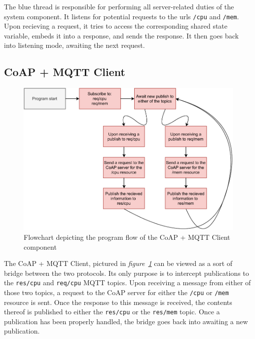 The blue thread is responsible for performing all server-related duties of the system component. It listens for potential requests to the urls \lstinline{/cpu} and \lstinline{/mem}. Upon recieving a request, it tries to access the corresponding shared state variable, embeds it into a response, and sends the response. It then goes back into listening mode, awaiting the next request.

\subsection{CoAP + MQTT Client}

\begin{figure}[H]
	\begin{center}
		\includegraphics[width=\textwidth]{./doc/coap_mqtt_flowchart.pdf}
		\caption{Flowchart depicting the program flow of the CoAP + MQTT Client component} 
		\label{coap-mqtt}
	\end{center}
\end{figure}

The CoAP + MQTT Client, pictured in \textit{figure~\ref{coap-mqtt}} can be viewed as a sort of bridge between the two protocols. Its only purpose is to intercept publications to the \lstinline{res/cpu} and \lstinline{req/cpu} MQTT topics. Upon receiving a message from either of those two topics, a request to the CoAP server for either the \lstinline{/cpu} or \lstinline{/mem} resource is sent. Once the response to this message is received, the contents thereof is published to either the \lstinline{res/cpu} or the \lstinline{res/mem} topic. Once a publication has been properly handled, the bridge goes back into awaiting a new publication.

